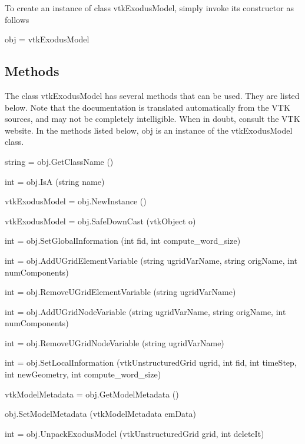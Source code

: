 To create an instance of class vtk\-Exodus\-Model, simply invoke its constructor as follows \begin{DoxyVerb}  obj = vtkExodusModel
\end{DoxyVerb}
 \hypertarget{vtkwidgets_vtkxyplotwidget_Methods}{}\subsection{Methods}\label{vtkwidgets_vtkxyplotwidget_Methods}
The class vtk\-Exodus\-Model has several methods that can be used. They are listed below. Note that the documentation is translated automatically from the V\-T\-K sources, and may not be completely intelligible. When in doubt, consult the V\-T\-K website. In the methods listed below, {\ttfamily obj} is an instance of the vtk\-Exodus\-Model class. 
\begin{DoxyItemize}
\item {\ttfamily string = obj.\-Get\-Class\-Name ()}  
\item {\ttfamily int = obj.\-Is\-A (string name)}  
\item {\ttfamily vtk\-Exodus\-Model = obj.\-New\-Instance ()}  
\item {\ttfamily vtk\-Exodus\-Model = obj.\-Safe\-Down\-Cast (vtk\-Object o)}  
\item {\ttfamily int = obj.\-Set\-Global\-Information (int fid, int compute\-\_\-word\-\_\-size)}  
\item {\ttfamily int = obj.\-Add\-U\-Grid\-Element\-Variable (string ugrid\-Var\-Name, string orig\-Name, int num\-Components)}  
\item {\ttfamily int = obj.\-Remove\-U\-Grid\-Element\-Variable (string ugrid\-Var\-Name)}  
\item {\ttfamily int = obj.\-Add\-U\-Grid\-Node\-Variable (string ugrid\-Var\-Name, string orig\-Name, int num\-Components)}  
\item {\ttfamily int = obj.\-Remove\-U\-Grid\-Node\-Variable (string ugrid\-Var\-Name)}  
\item {\ttfamily int = obj.\-Set\-Local\-Information (vtk\-Unstructured\-Grid ugrid, int fid, int time\-Step, int new\-Geometry, int compute\-\_\-word\-\_\-size)}  
\item {\ttfamily vtk\-Model\-Metadata = obj.\-Get\-Model\-Metadata ()}  
\item {\ttfamily obj.\-Set\-Model\-Metadata (vtk\-Model\-Metadata em\-Data)}  
\item {\ttfamily int = obj.\-Unpack\-Exodus\-Model (vtk\-Unstructured\-Grid grid, int delete\-It)}  

\end{DoxyItemize}
